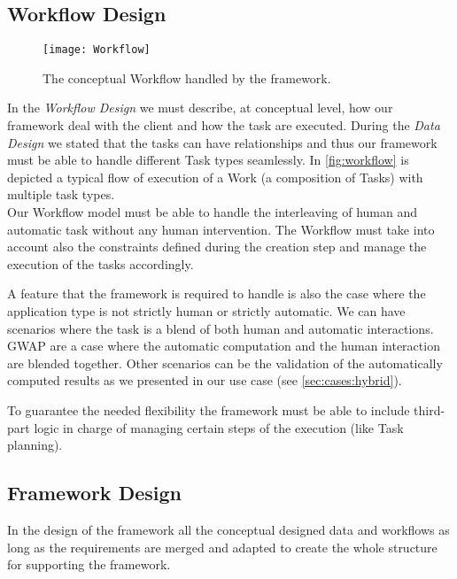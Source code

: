 \subsection{Workflow Design}\label{design:work}
\begin{figure}[htb]
    \centering
    \texttt{[image: Workflow]}
    \caption{The conceptual Workflow handled by the framework.}
    \label{fig:workflow}
\end{figure}
% 
In the \emph{Workflow Design} we must describe, at conceptual level, how our
framework deal with the client and how the task are executed. During the
\emph{Data Design} we stated that the tasks can have relationships and thus our
framework must be able to handle different Task types seamlessly. In
\autoref{fig:workflow} is depicted a typical flow of execution of a Work (a
composition of Tasks) with multiple task types.\\

Our Workflow model must be able to handle the interleaving of human and automatic
task without any human intervention. The Workflow must take into account also the
constraints defined during the creation step and manage the execution of the
tasks accordingly.

A feature that the framework is required to handle is also the case where
the application type is not strictly human or strictly automatic. We can have
scenarios where the task is a blend of both human and automatic interactions.
\ac{GWAP} are a case where the automatic computation and the human interaction
are blended together. Other scenarios can be the validation of the automatically
computed results as we presented in our use case (see \ref{sec:cases:hybrid}).

To guarantee the needed flexibility the framework must be able to include third-part
logic in charge of managing certain steps of the execution (like Task planning).




\subsection{Framework Design}
In the design of the framework all the conceptual designed data and workflows as
long as the requirements are merged and adapted to create the whole structure for
supporting the framework.\\

